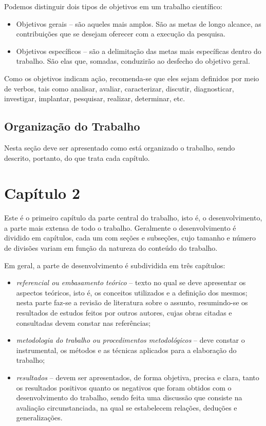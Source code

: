 \documentclass[
	12pt,				%
	openright,			%
	oneside,	
	a4paper,				%
	english,				%
	brazil				%
]{abntex2/abntex2} %
\begin{document}
		Podemos distinguir dois tipos de objetivos em um trabalho científico:
		
		\begin{itemize}
			\item Objetivos gerais – são aqueles mais amplos. São as metas de longo alcance, as contribuições que se desejam oferecer com a execução da pesquisa.

			\item Objetivos específicos – são a delimitação das metas mais específicas dentro do trabalho. São elas que, somadas, conduzirão ao desfecho do objetivo geral.
		\end{itemize}
		
		Como os objetivos indicam ação, recomenda-se que eles sejam definidos por meio de verbos, tais como analisar, avaliar, caracterizar, discutir, diagnosticar, investigar, implantar, pesquisar, realizar, determinar, etc.
		
	\section{Organização do Trabalho}
	
		Nesta seção deve ser apresentado como está organizado o trabalho, sendo descrito, portanto, do que trata cada capítulo.


\chapter{Capítulo 2}

	Este é o primeiro capítulo da parte central do trabalho, isto é, o
desenvolvimento, a parte mais extensa de todo o trabalho. Geralmente o
desenvolvimento é dividido em capítulos, cada um com seções e subseções,
cujo tamanho e número de divisões variam em função da natureza do
conteúdo do trabalho.

	Em geral, a parte de desenvolvimento é subdividida em três capítulos:

	\begin{itemize}
		\item \textit{referencial ou embasamento teórico} – texto no qual se deve apresentar os aspectos teóricos, isto é, os conceitos utilizados e a definição dos mesmos; nesta parte faz-se a revisão de literatura sobre o assunto, resumindo-se os resultados de estudos feitos por outros autores, cujas obras citadas e consultadas devem constar nas referências;
	
		\item \textit{metodologia do trabalho ou procedimentos metodológicos} – deve constar o instrumental, os métodos e as técnicas aplicados para a elaboração do trabalho;
	
		\item \textit{resultados} – devem ser apresentados, de forma objetiva, precisa e clara, tanto os resultados positivos quanto os negativos que foram obtidos com o desenvolvimento do trabalho, sendo feita uma discussão que consiste na avaliação circunstanciada, na qual se estabelecem relações, deduções e generalizações.
	\end{itemize}
\end{document}
